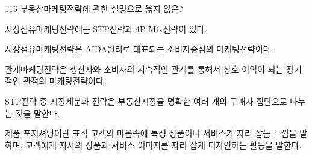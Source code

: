 \begin{question}{115}
부동산마케팅전략에 관한 설명으로 옳지 않은? %
\begin{choices}
  \item 시장점유마케팅전략에는 STP전략과 4P Mix전략이 있다.
  \item 시장점유마케팅전략은 AIDA원리로 대표되는 소비자중심의 마케팅전략이다.
  \item 관계마케팅전략은 생산자와 소비자의 지속적인 관계를 통해서 상호 이익이 되는 장기적인 관점의 마케팅전략이다.
  \item STP전략 중 시장세분화 전략은 부동산시장을 명확한 여러 개의 구매자 집단으로 나누는 것을 말한다.
  \item 제품 포지셔닝이란 표적 고객의 마음속에 특정 상품이나 서비스가 자리 잡는 느낌을 말하며, 고객에게 자사의 상품과 서비스 이미지를 자리 잡게 디자인하는 활동을 말한다.
\end{choices}
\end{question}
